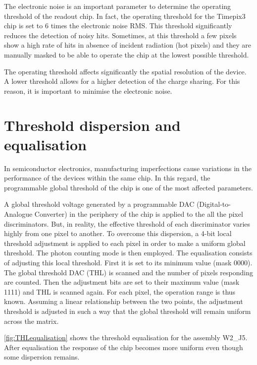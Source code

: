 The electronic noise is an important parameter to determine the
operating threshold of the readout chip. In fact, the operating
threshold for the Timepix3 chip is set to 6 times the electronic noise
RMS. This threshold significantly reduces the detection of noisy
hits. Sometimes, at this threshold a few pixels show a high rate of
hits in absence of incident radiation (hot pixels) and they are
manually masked to be able to operate the chip at the lowest possible
threshold.

The operating threshold affects significantly the spatial resolution
of the device. A lower threshold allows for a higher detection of the
charge sharing. For this reason, it is important to minimise the
electronic noise.

\section{Threshold dispersion and equalisation} 
\label{sec:ThresholdEqualisation}


In semiconductor electronics, manufacturing imperfections cause
variations in the performance of the devices within the same chip. In
this regard, the programmable global threshold of the chip is one of
the most affected parameters. 

A global threshold voltage generated by a programmable DAC
(Digital-to-Analogue Converter) in the periphery of the chip is
applied to the all the pixel discriminators. But, in reality, the
effective threshold of each discriminator varies highly from one pixel
to another. To overcome this dispersion, a 4-bit local threshold
adjustment is applied to each pixel in order to make a uniform global
threshold. The photon counting mode is then employed. The equalisation
consists of adjusting this local threshold. First it is set to its
minimum value (mask 0000). The global threshold DAC (THL) is scanned
and the number of pixels responding are counted. Then the adjustment
bits are set to their maximum value (mask 1111) and THL is scanned
again. For each pixel, the operation range is thus known. Assuming a
linear relationship between the two points, the adjustment threshold
is adjusted in such a way that the global threshold will remain
uniform across the matrix.

\cref{fig:THLequalisation} shows the threshold equalisation for the
assembly W2\_J5. After equalisation the response of the chip becomes
more uniform even though some dispersion remains.

